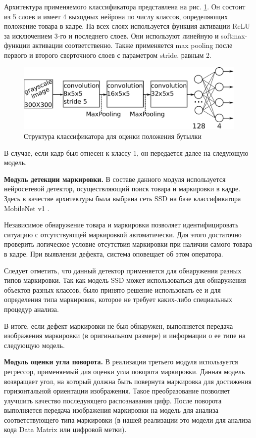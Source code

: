 Архитектура применяемого классификатора представлена на рис. \ref{fig:nn_class1}. Он состоит из 5 слоев и имеет 4 выходных нейрона по числу классов, определяющих положение товара в кадре. На всех слоях используется функция активации ReLU за исключением 3-го и последнего слоев. Они используют линейную и softmax-функции активации соответственно. Также применяется max pooling после первого и второго сверточного слоев с параметром stride, равным 2.

\begin{figure}[ht]
	\centering
	\includegraphics[width=16cm]{man-source/images/ch4/pic4-4.pdf}
	\caption{Структура классификатора для оценки положения бутылки \cite{26-A}}
	\label{fig:nn_class1}
\end{figure}

В случае, если кадр был отнесен к классу 1, он передается далее на следующую модель. 

\textbf{Модуль детекции маркировки.} В составе данного модуля используется нейросетевой детектор, осуществляющий поиск товара и маркировки в кадре. Здесь в качестве архитектуры была выбрана сеть SSD \cite{liu} на базе классификатора MobileNet v1 \cite{howard}.

Независимое обнаружение товара и маркировки позволяет идентифицировать ситуацию с отсутствующей маркировкой автоматически. Для этого достаточно проверить логическое условие отсутствия маркировки при наличии самого товара в кадре. При выявлении дефекта, система оповещает об этом оператора.

Следует отметить, что данный детектор применяется для обнаружения разных типов маркировки. Так как модель SSD может использоваться для обнаружения объектов разных классов, было принято решение использовать ее и для определения типа маркировок, которое не требует каких-либо специальных процедур анализа. 

В итоге, если дефект маркировки не был обнаружен, выполняется передача изображения маркировки (в оригинальном размере) и информации о ее типе на следующую модель.

\textbf{Модуль оценки угла поворота.} В реализации третьего модуля используется регрессор, применяемый для оценки угла поворота маркировки. Данная модель возвращает угол, на который должна быть повернута маркировка для достижения горизонтальной ориентации изображения. Такое преобразование позволяет улучшить качество последующего распознавания цифр. После поворота выполняется передача изображения маркировки на модель для анализа соответствующего типа маркировки (в нашей реализации это модели для анализа кода Data Matrix или цифровой метки).

